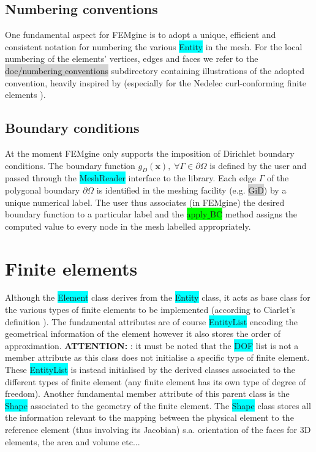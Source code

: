 \documentclass[11pt]{article}
\begin{document}
\subsection{Numbering conventions}
One fundamental aspect for FEMgine is to adopt a unique, efficient and consistent notation for numbering the various \colorbox{cyan}{Entity} in the mesh. For the local numbering of the elements' vertices, edges and faces we refer to the \colorbox{lightgray}{doc/numbering$\_$conventions} subdirectory containing illustrations of the adopted convention, heavily inspired by \cite{TAP97} (especially for the Nedelec curl-conforming finite elements \cite{Nedelec}).

\subsection{Boundary conditions}
At the moment FEMgine only supports the imposition of Dirichlet boundary conditions. The boundary function $g_D(\mathbf{x}),\;\forall\Gamma\in\partial\Omega$ is defined by the user and passed through the \colorbox{cyan}{MeshReader} interface to the library. Each edge $\Gamma$ of the polygonal boundary $\partial\Omega$ is identified in the meshing facility (e.g. \colorbox{lightgray}{GiD}) by a unique numerical label. The user thus associates (in FEMgine) the desired boundary function to a particular label and the \colorbox{lime}{apply$\_$BC} method assigns the computed value to every node in the mesh labelled appropriately.

\section{Finite elements}
\noindent
Although the \colorbox{cyan}{Element} class derives from the \colorbox{cyan}{Entity} class, it acts as base class for the various types of finite elements to be implemented (according to Ciarlet's definition \cite{Ciarlet}). The fundamental attributes are of course \colorbox{cyan}{EntityList} encoding the geometrical information of the element however it also stores the order of approximation. \color{red} \textbf{ATTENTION:} \color{black}: it must be noted that the \colorbox{cyan}{DOF} list is not a member attribute as this class does not initialise a specific type of finite element. These \colorbox{cyan}{EntityList} is instead initialised by the derived classes associated to the different types of finite element (any finite element has its own type of degree of freedom). Another fundamental member attribute of this parent class is the \colorbox{cyan}{Shape} associated to the geometry of the finite element. The \colorbox{cyan}{Shape} class stores all the information relevant to the mapping between the physical element to the reference element (thus involving its Jacobian) s.a. orientation of the faces for $3$D elements, the area and volume etc...
\end{document}
